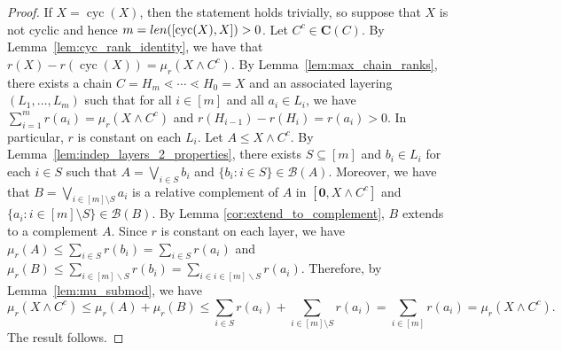 \documentclass[10pt,a4paper]{amsart}
\DeclareMathOperator{\cyc}{cyc}
\newcommand{\len}{\textup{len}}
\newcommand{\zero}{{\mathbf{0}}}
\begin{document}
\begin{proof}
    If $X=\cyc(X)$, then the statement holds trivially, so suppose that $X$ is not cyclic and hence $m=\len([\cyc(X),X])>0$. 
    Let $C^c\in\mathbf{C}(C)$. By Lemma~\ref{lem:cyc_rank_identity}, we have that
        $r(X)-r(\cyc(X))=\mu_r(X\wedge C^c).$
    By Lemma~\ref{lem:max_chain_ranks}, there exists a chain $C=H_m\lessdot\cdots\lessdot H_0=X$ and an associated layering 
    $(L_1,\dots,L_m)$ such that for all $i\in[m]$ and all $a_i\in L_i$, we have 
    $\sum_{i=1}^mr(a_i) = \mu_r(X\wedge C^c)$ and $r(H_{i-1})-r(H_i)=r(a_i)>0$.
    In particular, $r$ is constant on each $L_i$. 
    Let $A\leq X\wedge C^c$. By Lemma~\ref{lem:indep_layers_2_properties}, there exists $S\subseteq[m]$ and $b_i\in L_i$ for each $i\in S$ such that $A=\bigvee_{i\in S}b_i$ and $\{b_i:i\in S\}\in\mathcal{B}(A)$. Moreover, we have that $B=\bigvee_{i\in[m]\setminus S}a_i$ is a relative complement of $A$ in $[\zero,X\wedge C^c]$ and $\{a_i:i\in [m]\setminus S\}\in\mathcal{B}(B)$. By Lemma \ref{cor:extend_to_complement}, $B$ extends to a complement $A$. Since $r$ is constant on each layer, we have $\mu_r(A) \leq \sum_{i\in S}r(b_i)=\sum_{i\in S}r(a_i)$ and 
    $\mu_r(B)\leq \sum_{i\in [m] \backslash S}r(b_i)=\sum_{i\in i\in [m] \backslash S}r(a_i)$. Therefore, by Lemma~\ref{lem:mu_submod}, we have
    $$\mu_r(X\wedge C^c)\leq\mu_r(A)+\mu_r(B)\leq\sum_{i\in S}r(a_i)+\sum_{i\in[m]\setminus S}r(a_i)=\sum_{i\in[m]}r(a_i)=\mu_r(X\wedge C^c).$$
    The result follows.
    \end{proof}
\end{document}
